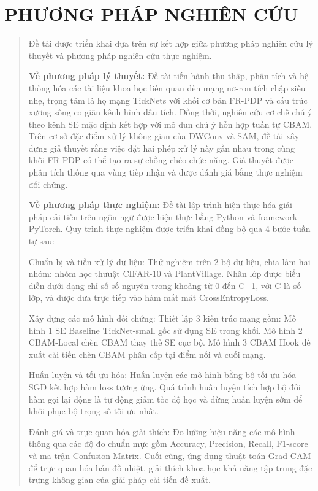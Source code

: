 \documentclass[
  12pt,
  a4paper,
]{report}
\begin{document}
\section{PHƯƠNG PHÁP NGHIÊN
CỨU}\label{phux1b0ux1a1ng-phuxe1p-nghiuxean-cux1ee9u}

\begin{quote}
Đề tài được triển khai dựa trên sự kết hợp giữa phương pháp nghiên cứu
lý thuyết và phương pháp nghiên cứu thực nghiệm.

\textbf{Về phương pháp lý thuyết:} Đề tài tiến hành thu thập, phân tích
và hệ thống hóa các tài liệu khoa học liên quan đến mạng nơ-ron tích
chập siêu nhẹ, trọng tâm là họ mạng TickNets với khối cơ bản FR-PDP và
cấu trúc xương sống co giãn kênh hình dấu tích. Đồng thời, nghiên cứu cơ
chế chú ý theo kênh SE mặc định kết hợp với mô đun chú ý hỗn hợp tuần tự
CBAM. Trên cơ sở đặc điểm xử lý không gian của DWConv và SAM, đề tài xây
dựng giả thuyết rằng việc đặt hai phép xử lý này gần nhau trong cùng
khối FR-PDP có thể tạo ra sự chồng chéo chức năng. Giả thuyết được phân
tích thông qua vùng tiếp nhận và được đánh giá bằng thực nghiệm đối
chứng.

\textbf{Về phương pháp thực nghiệm:} Đề tài lập trình hiện thực hóa giải
pháp cải tiến trên ngôn ngữ được hiện thực bằng Python và framework
PyTorch. Quy trình thực nghiệm được triển khai đồng bộ qua 4 bước tuần
tự sau:

Chuẩn bị và tiền xử lý dữ liệu: Thử nghiệm trên 2 bộ dữ liệu, chia làm
hai nhóm: nhóm học thưuật CIFAR-10 và PlantVillage. Nhãn lớp được biểu
diễn dưới dạng chỉ số số nguyên trong khoảng từ 0 đến C−1, với C là số
lớp, và được đưa trực tiếp vào hàm mất mát CrossEntropyLoss.

Xây dựng các mô hình đối chứng: Thiết lập 3 kiến trúc mạng gồm: Mô hình
1 SE Baseline TickNet-small gốc sử dụng SE trong khối. Mô hình 2
CBAM-Local chèn CBAM thay thế SE cục bộ. Mô hình 3 CBAM Hook đề xuất cải
tiến chèn CBAM phân cấp tại điểm nối và cuối mạng.

Huấn luyện và tối ưu hóa: Huấn luyện các mô hình bằng bộ tối ưu hóa SGD
kết hợp hàm loss tương ứng. Quá trình huấn luyện tích hợp bộ đôi hàm gọi
lại động là tự động giảm tốc độ học và dừng huấn luyện sớm để khôi phục
bộ trọng số tối ưu nhất.

Đánh giá và trực quan hóa giải thích: Đo lường hiệu năng các mô hình
thông qua các độ đo chuẩn mực gồm Accuracy, Precision, Recall, F1-score
và ma trận Confusion Matrix. Cuối cùng, ứng dụng thuật toán Grad-CAM để
trực quan hóa bản đồ nhiệt, giải thích khoa học khả năng tập trung đặc
trưng không gian của giải pháp cải tiến đề xuất.
\end{quote}
\end{document}
